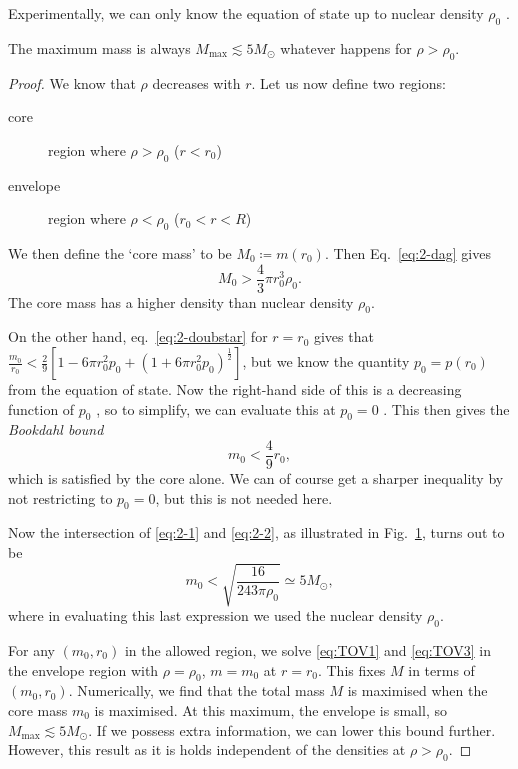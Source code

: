 Experimentally, we can only know the equation of state up to nuclear density $\rho_0$ .
\begin{claim}
  The maximum mass is always $M_{\text{max}} \lesssim 5 M_\odot$ whatever happens for $\rho > \rho_0$.
\end{claim}
\begin{proof}
  We know that $\rho$ decreases with $r$.
  Let us now define two regions:
  \begin{description}
    \item[core] region where $\rho > \rho_0$ ($r < r_0$)
    \item[envelope] region where $\rho < \rho_0$ ($r_0 < r < R$)
  \end{description}
  We then define the `core mass' to be $M_0 \coloneqq m(r_0)$.
  Then Eq.~\eqref{eq:2-dag} gives 
  \begin{equation}
    \label{eq:2-1}
    M_0 > \frac{4}{3} \pi r^3_0 \rho_0.
  \end{equation}
  The core mass has a higher density than nuclear density $\rho_0$.

  On the other hand, eq.~\eqref{eq:2-doubstar} for $r = r_0$ gives that $\frac{m_0}{r_0} < \frac{2}{9}\left[ 1 -6 \pi r_0^2 p_0 + (1 + 6 \pi r_0^2 p_0)^{\frac{1}{2}} \right]$, but we know the quantity $p_0 = p(r_0)$  from the equation of state.
  Now the right-hand side of this is a decreasing function of $p_0$ , so to simplify, we can evaluate this at $p_0 = 0$ . This then gives the \emph{Bookdahl bound}
  \begin{equation}
    \label{eq:2-2}
    m_0 < \frac{4}{9} r_0,
  \end{equation}
  which is satisfied by the core alone.
  We can of course get a sharper inequality by not restricting to $p_0 = 0$, but this is not needed here.
  \begin{figure}[tbhp]
    \centering
    \def\svgwidth{0.4\columnwidth}
    
    \caption{}
    \label{fig:l2f2}
  \end{figure}
  Now the intersection of \eqref{eq:2-1} and \eqref{eq:2-2}, as illustrated in Fig.~\ref{fig:l2f2}, turns out to be
  \begin{equation}
    m_0 < \sqrt{\frac{16}{243 \pi \rho_0}} \simeq 5 M_\odot,
  \end{equation}
  where in evaluating this last expression we used the nuclear density $\rho_0$.

  For any $(m_0, r_0)$ in the allowed region, we solve \eqref{eq:TOV1} and \eqref{eq:TOV3} in the envelope region with $\rho = \rho_0$, $m = m_0$ at $r = r_0$. This fixes $M$ in terms of $(m_0, r_0)$.
  Numerically, we find that the total mass $M$ is maximised when the core mass $m_0$ is maximised.
  At this maximum, the envelope is small, so $M_{\text{max}} \lesssim 5 M_\odot$.
  If we possess extra information, we can lower this bound further. However, this result as it is holds independent of the densities at $\rho > \rho_0$.
\end{proof}


